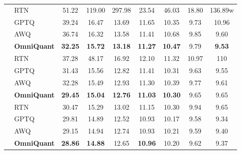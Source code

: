 \documentclass{article} %
\begin{document}
\begin{table}[!ht]
\begin{tabular}{llccccccc}
         & RTN & 51.22  & 119.00 & 297.98 & 23.54 & 46.03 & 18.80 & 136.89w  \\
         & GPTQ &  39.24 & 16.47 & 13.69 & 11.65 & 10.35 &  9.73 & 10.96 \\
         & AWQ & 36.74 & 16.32 & 13.58 & 11.41 & 10.68 &  9.85 & 9.60  \\
         & \textbf{OmniQuant}  & \textbf{32.25} & \textbf{15.72} & \textbf{13.18} & \textbf{11.27} & \textbf{10.47} & 9.79 & \textbf{9.53} \\ \hline
          & RTN & 37.28 & 48.17 & 16.92 & 12.10 & 11.32 & 10.97 & 110 \\
         & GPTQ & 31.43 & 15.56 & 12.82 & 11.41 & 10.31 & 9.63 & 9.55 \\
         & AWQ & 32.28 & 15.49 & 12.93 & 11.30 & 10.39 &  9.77 & 9.61  \\
         & \textbf{OmniQuant} & \textbf{29.45} & \textbf{15.04} & \textbf{12.76} & \textbf{11.03} &  \textbf{10.30} & 9.65 & 9.65 \\ 
         \hline
          & RTN & 30.47 & 15.29  & 13.02 & 11.15 & 10.30 & 9.94 & 9.65 \\
         & GPTQ & 29.81  & 14.89 & 12.52 & 10.93 & 10.17 & 9.58 & 9.34 \\
         & AWQ & 29.15  & 14.94 & 12.74 & 10.93 & 10.21 & 9.59 & 9.40 \\
         & \textbf{OmniQuant} & \textbf{28.86}   & \textbf{14.88} & 12.65 & \textbf{10.96} &  10.20 & 9.62 &  9.37 \\
        \hline
    \end{tabular}
    \label{tab:opt_weight_only_wiki}
\end{table}
\end{document}
